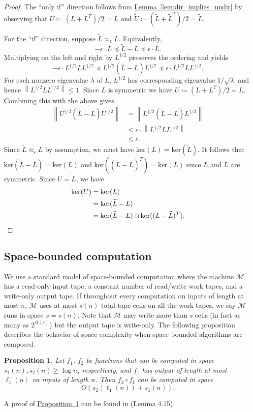 \documentclass[11pt]{article}
\numberwithin{equation}{section}
\newtheorem{proposition}[theorem]{Proposition}
\theoremstyle{definition}
\theoremstyle{plain}
\newcommand{\expref}[2]{\hyperref[#2]{#1~\ref{#2}}}
\newcommand{\wt}{\widetilde}   %
\numberwithin{myalgctr}{section}
\theoremstyle{named}
\begin{document}
\begin{proof}
The ``only if'' direction follows from \expref{Lemma}{lem:dir_implies_undir} by observing that $U\coloneqq(L+L^T)/2=L$ and $\wt{U}\coloneqq (\wt{L}+\wt{L}^T)/2=\wt{L}$.

For the ``if'' direction, suppose $\wt{L}\approx_{\epsilon}L$. Equivalently,
\[
-\epsilon\cdot L \preceq \wt{L}-L\preceq \epsilon\cdot L.
\]
Multiplying on the left and right by $L^{\dagger/2}$ preserves the ordering and yields
\[
-\epsilon\cdot L^{\dagger/2}LL^{\dagger/2} \preceq L^{\dagger/2}(\wt{L}-L)L^{\dagger/2}\preceq \epsilon\cdot L^{\dagger/2}LL^{\dagger/2}.
\]
For each nonzero eigenvalue $\lambda$ of $L$, $L^{\dagger/2}$ has corresponding eigenvalue $1/\sqrt{\lambda}$ and hence $\left\|L^{\dagger/2}LL^{\dagger/2}\right\|\leq 1$. Since $L$ is symmetric we have $U\coloneqq(L+L^T)/2 = L$. Combining this with the above gives 
\begin{align*}
 \left\|U^{\dagger/2}(\wt{L}-L)U^{\dagger/2}\right\|&= \left\|L^{\dagger/2}(\wt{L}-L)L^{\dagger/2}\right\|\\
&\leq \epsilon\cdot\left\|L^{\dagger/2}LL^{\dagger/2}\right\|\\
&\leq \epsilon.
\end{align*}
Since $\wt{L}\approx_{\epsilon}L$ by assumption, we must have $\mathrm{ker}(L)=\mathrm{ker}(\wt{L})$. It follows that $\mathrm{ker}(\wt{L}-L)=\mathrm{ker}(L)$ and $\mathrm{ker}((\wt{L}-L)^T)=\mathrm{ker}(L)$ since $L$ and $\wt{L}$ are symmetric. Since $U=L$, we have 
\begin{align*}
\mathrm{ker}(U)&=\mathrm{ker}(L)\\
&=\mathrm{ker}(\wt{L}-L)\\
&=\mathrm{ker}(\wt{L}-L)\cap\mathrm{ker}((L-\wt{L})^T).   \qedhere
\end{align*}
\end{proof}

%
\subsection{Space-bounded computation}   %
\label{sect:spacemodel}
We use a standard model of space-bounded computation where the machine $\mathcal{M}$ has a read-only input tape, a constant number of  read/write work tapes, and a write-only output tape. If throughout every computation on inputs of length at most $n$, $\mathcal{M}$ uses at most $s(n)$ total tape cells on all the work tapes, we say $\mathcal{M}$ runs in space $s=s(n)$. Note that $\mathcal{M}$ may write more than $s$ cells (in fact as many as $2^{O(s)}$) but the output tape is write-only. The following proposition describes the behavior of space complexity when space bounded algorithms are composed. 
\begin{proposition}
\label{prop:composition}
Let $f_1$, $f_2$ be functions that can be computed in space $s_1(n),s_2(n)\geq \log n$, respectively, and $f_1$ has output of length at most $\ell_1(n)$ on inputs of length $n$. Then $f_2\circ f_1$ can be computed in space 
\[
O(s_2(\ell_1(n)) + s_1(n)).
\]
\end{proposition}
A proof of \expref{Proposition}{prop:composition} can be found in \cite{AroraBa09} (Lemma 4.15). 
%
\end{document}
